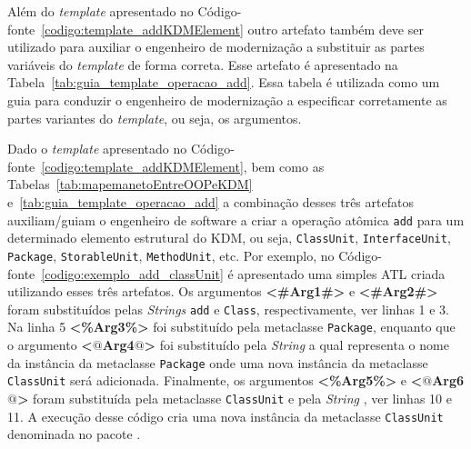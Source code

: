 

Além do \textit{template} apresentado no Código-fonte~\ref{codigo:template_addKDMElement} outro artefato também deve ser utilizado para auxiliar o engenheiro de modernização a substituir as partes variáveis do \textit{template} de forma correta. Esse artefato é apresentado na Tabela~\ref{tab:guia_template_operacao_add}. Essa tabela é utilizada como um guia para conduzir o engenheiro de modernização a especificar corretamente as partes variantes do \textit{template}, ou seja, os argumentos.

Dado o \textit{template} apresentado no Código-fonte~\ref{codigo:template_addKDMElement}, bem como as Tabelas~\ref{tab:mapemanetoEntreOOPeKDM} e~\ref{tab:guia_template_operacao_add} a combinação desses três artefatos auxiliam/guiam o engenheiro de software a criar a operação atômica \texttt{add} para um determinado elemento estrutural do KDM, ou seja, \texttt{ClassUnit}, \texttt{InterfaceUnit}, \texttt{Package}, \texttt{StorableUnit}, \texttt{MethodUnit}, etc. Por exemplo, 
%
%
%
%
%
no Código-fonte~\ref{codigo:exemplo_add_classUnit} é apresentado uma simples ATL criada utilizando esses três artefatos. Os argumentos \textbf{<\#Arg1\#>} e \textbf{<\#Arg2\#>} foram substituídos pelas \textit{Strings} \texttt{add} e \texttt{Class}, respectivamente, ver linhas 1 e 3. Na linha 5 \textbf{<\%Arg3\%>} foi substituído pela metaclasse \texttt{Package}, enquanto que o argumento \textbf{<$@$Arg4$@$>} foi substituído pela \textit{String} \texttt{} a qual representa o nome da instância da metaclasse \texttt{Package} onde uma nova instância da metaclasse \texttt{ClassUnit} será adicionada. Finalmente, os argumentos \textbf{<\%Arg5\%>} e \textbf{<$@$Arg6$@$>} foram substituída pela metaclasse \texttt{ClassUnit} e pela \textit{String} \texttt{}, ver linhas 10 e 11.  A execução desse código cria uma nova instância da metaclasse \texttt{ClassUnit} denominada  no pacote .

